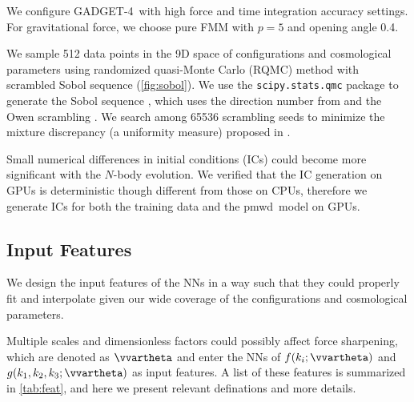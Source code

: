 \documentclass[modern, trackchanges, dvipsnames]{aastex631}
\newcommand{\pmwd}{{\usefont{T1}{nova}{m}{sl}pmwd}}
\newcommand{\GADGET}{{{\fontsize{10pt}{12pt}\selectfont GADGET}-4}}
\begin{document}
We configure \GADGET\ with high force and time integration accuracy
settings.
For gravitational force, we choose pure FMM with $p=5$ and opening angle
0.4.

We sample 512 data points in the 9D space of configurations and
cosmological parameters using randomized quasi-Monte Carlo (RQMC) method
with scrambled Sobol sequence (\autoref{fig:sobol}).
We use the \texttt{scipy.stats.qmc} package \citep{SciPy} to generate
the Sobol sequence \citep{Sobol1967}, which uses the direction number
from \citet{JoeKuo2008} and the Owen scrambling \citep{Owen1998}.
We search among 65536 scrambling seeds to minimize the mixture
discrepancy (a uniformity measure) proposed in \citet{Zhou2013MD}.

Small numerical differences in initial conditions (ICs) could become
more significant with the $N$-body evolution.
We verified that the IC generation on GPUs is deterministic though
different from those on CPUs, therefore we generate ICs for both the
training data and the \pmwd\ model on GPUs.


\vspace{1em}
\subsection{Input Features}
\label{sec:features}

We design the input features of the NNs in a way such that they could
properly fit and interpolate given our wide coverage of the
configurations and cosmological parameters.

Multiple scales and dimensionless factors could possibly affect force
sharpening, which are denoted as $\vvartheta$ and enter the NNs of $f(k_i;
\vvartheta)$ and $g(k_1, k_2, k_3; \vvartheta)$ as input features.
A list of these features is summarized in \autoref{tab:feat}, and here we
present relevant definations and more details.
\end{document}
